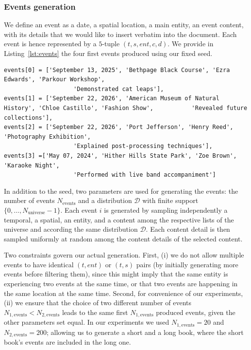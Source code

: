 \documentclass{article}
\begin{document}
\subsubsection{Events generation}\label{app:1book:events_generation}

We define an event as a date, a spatial location, a main entity, an event content, with its details that we would like to insert verbatim into the document. Each event is hence represented by a $5$-tuple $(t,s,ent,c,d)$. We provide in Listing~\ref{lst:events} the four first events produced using our fixed seed.

\begin{lstlisting}[style=mystyle, caption={Excerpt of the first four events.}, label={lst:events}]
events[0] = ['September 13, 2025', 'Bethpage Black Course', 'Ezra Edwards', 'Parkour Workshop',
                    'Demonstrated cat leaps'],
events[1] = ['September 22, 2026', 'American Museum of Natural History', 'Chloe Castillo', 'Fashion Show',           'Revealed future collections'],
events[2] = ['September 22, 2026', 'Port Jefferson', 'Henry Reed', 'Photography Exhibition',
                    'Explained post-processing techniques'], 
events[3] =['May 07, 2024', 'Hither Hills State Park', 'Zoe Brown', 'Karaoke Night',
                    'Performed with live band accompaniment']
\end{lstlisting}

In addition to the seed, two parameters are used for generating the events: the number of events $N_\text{events}$ and a distribution $\mathcal{D}$ with finite support $\lbrace 0, \ldots, N_{\text{universe}} -1 \rbrace$.
Each event $i$ is generated by sampling independently a temporal, a spatial, an entity, and a content among the respective lists of the universe and according the same distribution $\mathcal{D}$.
Each content detail is then sampled uniformly at random among the content details of the selected content.

Two constraints govern our actual generation. First, (i) we do not allow multiple events to have identical $(t,ent)$ or $(t,s)$ pairs (by initially generating more events before filtering them), since this might imply that the same entity is experiencing two events at the same time, or that two events are happening in the same location at the same time. Second, for convenience of our experiments, (ii) we ensure that the choice of  two different number of events $N_{1, \text{events}} < N_{2, \text{events}}$ leads to the same first $N_{1, \text{events}}$ produced events, given the other parameters set equal. In our experiments we used $N_{1, \text{events}} = 20$ and $N_{2, \text{events}} = 200$; allowing us to generate a short and a long book, where the short book's events are included in the long one.
\end{document}
